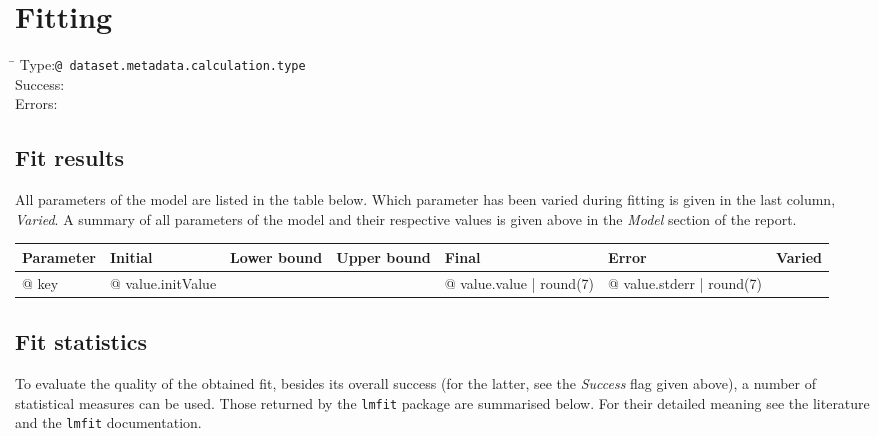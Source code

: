 \section{Fitting}

\begin{tabbing}
\hspace*{1.5cm}\=\kill
Type:\>\texttt{{@ dataset.metadata.calculation.type }}
\\
Success:\>%
\\
Errors:\>%
\end{tabbing}

\subsection{Fit results}

All parameters of the model are listed in the table below. Which parameter has been varied during fitting is given in the last column, \emph{Varied}. A summary of all parameters of the model and their respective values is given above in the \emph{Model} section of the report.

\vspace*{1ex}

\begin{tabular}{lllllll}
\toprule
\textbf{Parameter} & Initial & Lower bound & Upper bound & Final & Error & Varied
\\
\midrule
{@ key } & {@ value.initValue }
& %
& %
& {@ value.value | round(7) } & {@ value.stderr | round(7) } & %
\\
\bottomrule
\end{tabular}


\subsection{Fit statistics}

To evaluate the quality of the obtained fit, besides its overall success (for the latter, see the \emph{Success} flag given above), a number of statistical measures can be used. Those returned by the \texttt{lmfit} package are summarised below. For their detailed meaning see the literature and the \texttt{lmfit} documentation.

